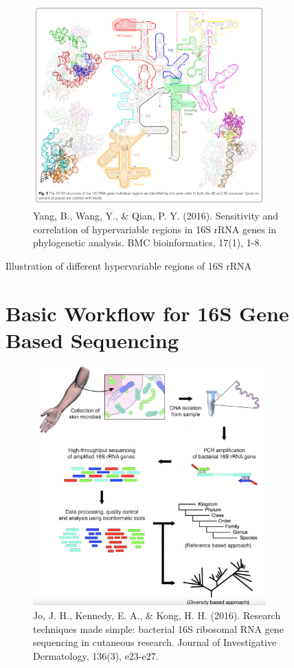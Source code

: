 \documentclass[
]{book}
\begin{document}
\begin{figure}
\centering
\includegraphics[width=0.8\textwidth,height=\textheight]{./Figures/Hypervariable2.png}
\caption{Yang, B., Wang, Y., \& Qian, P. Y. (2016). Sensitivity and correlation of hypervariable regions in 16S rRNA genes in phylogenetic analysis. BMC bioinformatics, 17(1), 1-8.}
\end{figure}

Illustration of different hypervariable regions of 16S rRNA

\hypertarget{basic-workflow-for-16s-gene-based-sequencing}{%
\section{Basic Workflow for 16S Gene Based Sequencing}\label{basic-workflow-for-16s-gene-based-sequencing}}

\begin{figure}
\centering
\includegraphics[width=0.8\textwidth,height=\textheight]{./Figures/Workflow.png}
\caption{Jo, J. H., Kennedy, E. A., \& Kong, H. H. (2016). Research techniques made simple: bacterial 16S ribosomal RNA gene sequencing in cutaneous research. Journal of Investigative Dermatology, 136(3), e23-e27.}
\end{figure}
\end{document}
